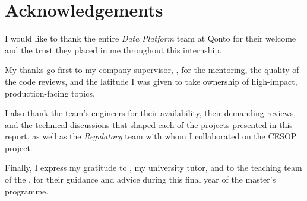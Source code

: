 \chapter*{Acknowledgements}

I would like to thank the entire \emph{Data Platform} team at Qonto for their welcome and the trust they placed in me throughout this internship.

My thanks go first to my company supervisor, \companyTutor{}, for the mentoring, the quality of the code reviews, and the latitude I was given to take ownership of high-impact, production-facing topics.

I also thank the team's engineers for their availability, their demanding reviews, and the technical discussions that shaped each of the projects presented in this report, as well as the \emph{Regulatory} team with whom I collaborated on the CESOP project.

Finally, I express my gratitude to \universityTutor{}, my university tutor, and to the teaching team of the \university{}, for their guidance and advice during this final year of the master's programme.
